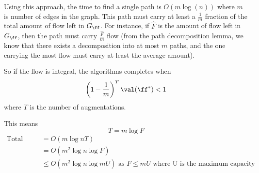 Using this approach, the time to find a single path is $O(m \log(n))$ where $m$ is number of edges in the graph.
This path must carry at least a \( \frac{1}{m}\) fraction of the total
amount of flow left in \(G_{\ff}\). For instance, if \(\hat{F}\) is
the amount of flow left in \(G_{\ff}\), then the path must carry
\(\frac{\hat{F}}{m}\) flow (from the path decomposition lemma, 
we know that there exists a decomposition into at most $m$ paths, 
and the one carrying the most flow must carry
at least the average amount).

So if the flow is integral, the algorithms completes when
\begin{equation}\nonumber
    \left( 1 - \frac{1}{m}\right)^T \val(\ff^*) < 1
\end{equation}
where $T$ is the number of augmentations.

This means
\begin{equation}\nonumber
    T = m \log{F}
\end{equation}
\begin{align*}
\text{Total time} &= O(m \log{n} T) \\
                  &= O(m^2 \log{n} \log{F})\\
                  &\leq O(m^2 \log{n} \log{mU}) \text { as }  F \leq m U \text{ where U is the maximum capacity}\\
\end{align*}

